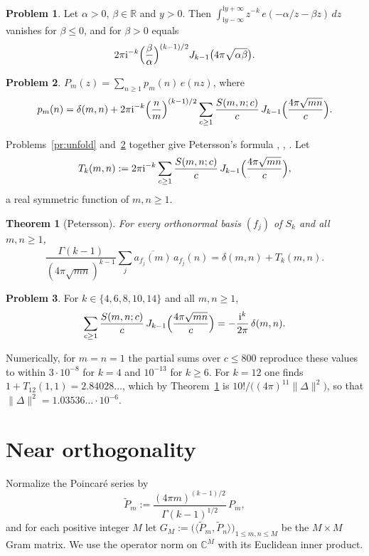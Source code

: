 \documentclass[reqno]{amsart}
\theoremstyle{definition}
\newtheorem{problem}{Problem}[section]
\theoremstyle{plain}
\newtheorem{theorem}{Theorem}[section]
\newcommand{\R}{\mathbb{R}}
\newcommand{\C}{\mathbb{C}}
\newcommand{\ii}{\mathrm{i}}
\newcommand{\Pt}{\widetilde{P}}
\begin{document}
\begin{problem}\label{pr:bessel-int}
Let \(\alpha > 0\), \(\beta \in \R\) and \(y > 0\).  Then \(\int_{\ii y - \infty}^{\ii y + \infty} z^{-k}\, e(-\alpha/z - \beta z)\, dz\) vanishes for \(\beta \le 0\), and for \(\beta > 0\) equals
\[
  2\pi\ii^{-k} \Bigl(\frac\beta\alpha\Bigr)^{(k-1)/2} J_{k-1}\bigl(4\pi\sqrt{\alpha\beta}\bigr) .
\]
\end{problem}

\begin{problem}\label{pr:fourier}
\(P_m(z) = \sum_{n \ge 1} p_m(n)\, e(nz)\), where
\[
  p_m(n) = \delta(m,n) + 2\pi\ii^{-k} \Bigl(\frac nm\Bigr)^{(k-1)/2} \sum_{c \ge 1} \frac{S(m,n;c)}{c}\, J_{k-1}\Bigl(\frac{4\pi\sqrt{mn}}{c}\Bigr) .
\]
\end{problem}

Problems~\ref{pr:unfold} and~\ref{pr:fourier} together give Petersson's formula \cite{Pe}, \cite[\S3.2]{Iw}, \cite[\S2]{ILS}.  Let
\[
  T_k(m,n) := 2\pi\ii^{-k} \sum_{c \ge 1} \frac{S(m,n;c)}{c}\, J_{k-1}\Bigl(\frac{4\pi\sqrt{mn}}{c}\Bigr) ,
\]
a real symmetric function of \(m, n \ge 1\).

\begin{theorem}[Petersson]\label{thm:petersson}
For every orthonormal basis \((f_j)\) of \(S_k\) and all \(m, n \ge 1\),
\[
  \frac{\Gamma(k-1)}{(4\pi\sqrt{mn})^{k-1}} \sum_j \overline{a_{f_j}(m)}\, a_{f_j}(n) = \delta(m,n) + T_k(m,n) .
\]
\end{theorem}

\begin{problem}\label{pr:vanishing}
For \(k \in \{4, 6, 8, 10, 14\}\) and all \(m, n \ge 1\),
\[
  \sum_{c \ge 1} \frac{S(m,n;c)}{c}\, J_{k-1}\Bigl(\frac{4\pi\sqrt{mn}}{c}\Bigr) = -\frac{\ii^k}{2\pi}\,\delta(m,n) .
\]
\end{problem}

Numerically, for \(m = n = 1\) the partial sums over \(c \le 800\) reproduce these values to within \(3 \cdot 10^{-8}\) for \(k = 4\) and \(10^{-13}\) for \(k \ge 6\).  For \(k = 12\) one finds \(1 + T_{12}(1,1) = 2.84028\ldots\), which by Theorem~\ref{thm:petersson} is \(10!/\bigl((4\pi)^{11}\lVert\Delta\rVert^2\bigr)\), so that \(\lVert\Delta\rVert^2 = 1.03536\ldots \cdot 10^{-6}\).

\section{Near orthogonality}\label{sec:near}

Normalize the Poincar\'e series by
\[
  \Pt_m := \frac{(4\pi m)^{(k-1)/2}}{\Gamma(k-1)^{1/2}}\, P_m ,
\]
and for each positive integer \(M\) let \(G_M := \bigl(\langle \Pt_m, \Pt_n\rangle\bigr)_{1 \le m,n \le M}\) be the \(M \times M\) Gram matrix.  We use the operator norm on \(\C^M\) with its Euclidean inner product.
\end{document}
